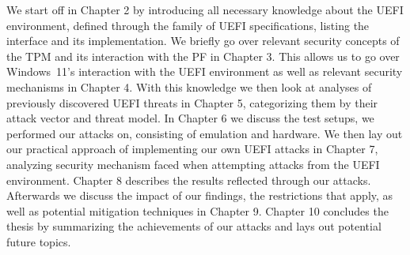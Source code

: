 We start off in Chapter 2 by introducing all necessary knowledge about the \ac{UEFI} environment, defined through the family of \ac{UEFI} specifications, listing the interface and its implementation.
We briefly go over relevant security concepts of the \ac{TPM} and its interaction with the \ac{PF} in Chapter 3.
This allows us to go over Windows~11's interaction with the \ac{UEFI} environment as well as relevant security mechanisms in Chapter 4.
With this knowledge we then look at analyses of previously discovered \ac{UEFI} threats in Chapter 5, categorizing them by their attack vector and threat model.
In Chapter 6 we discuss the test setups, we performed our attacks on, consisting of emulation and hardware.
We then lay out our practical approach of implementing our own \ac{UEFI} attacks in Chapter 7, analyzing security mechanism faced when attempting attacks from the UEFI environment.
Chapter 8 describes the results reflected through our attacks.
Afterwards we discuss the impact of our findings, the restrictions that apply, as well as potential mitigation techniques in Chapter 9.
Chapter 10 concludes the thesis by summarizing the achievements of our attacks and lays out potential future topics.